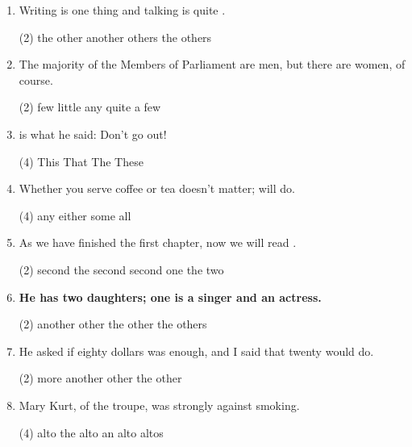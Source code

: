 \begin{enumerate}
\item Writing is one thing and talking is quite \ttu .
  \begin{tasks}(2)
    \task the other
    \task another
    \task others
    \task the others
  \end{tasks}

\item The majority of the Members of Parliament are men, but there are  \ttu  women, of course.
  \begin{tasks}(2)
    \task few
    \task little
    \task any
    \task quite a few
  \end{tasks}

\item  \ttu  is what he said: Don't go out!
  \begin{tasks}(4)
    \task This
    \task That
    \task The
    \task These
  \end{tasks}

\item Whether you serve coffee or tea doesn't matter;  \ttu  will do.
  \begin{tasks}(4)
    \task any \task either \task some \task all
  \end{tasks}


\item As we have finished the first chapter, now we will read  \ttu .
  \begin{tasks}(2)
    \task second \task the second \task second one \task the two
  \end{tasks}

\item \textbf{He has two daughters; one is a singer and \ttu  an actress.}
  \begin{tasks}(2)
    \task another \task other
    \task the other \task the others
  \end{tasks}

\item He asked if eighty dollars was enough, and I said that  \ttu twenty would
  do.
  \begin{tasks}(2)
    \task more \task another \task other \task the other
  \end{tasks}

\item Mary Kurt, \ttu  of the troupe, was strongly against smoking.
  \begin{tasks}(4)
    \task alto \task the alto \task an alto \task altos
  \end{tasks}


\end{enumerate}
